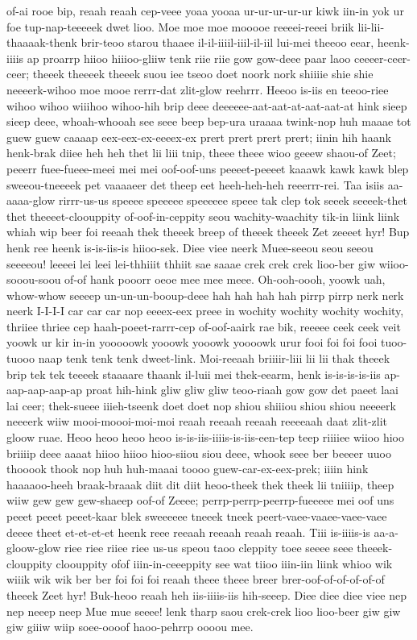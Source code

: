 \documentclass[12pt,a4paper]{article}
\begin{document}
\begin{drama}
of-ai rooe bip, reaah reaah cep-veee yoaa yooaa ur-ur-ur-ur-ur kiwk iin-in yok ur foe tup-nap-teeeeek dwet lioo. Moe moe moe mooooe reeeei-reeei briik lii-lii-thaaaak-thenk brir-teoo starou thaaee il-il-iiiil-iiil-il-iil lui-mei theeoo eear, heenk-iiiis ap proarrp hiioo hiiioo-gliiw tenk riie riie gow gow-deee paar laoo ceeeer-ceer-ceer; theeek theeeek theeek suou iee tseoo doet noork nork shiiiie shie shie neeeerk-wihoo moe mooe rerrr-dat zlit-glow reehrrr. Heeoo is-iis en teeoo-riee wihoo wihoo wiiihoo wihoo-hih brip deee deeeeee-aat-aat-at-aat-aat-at hink sieep sieep deee, whoah-whooah see seee beep bep-ura uraaaa twink-nop huh maaae tot guew guew caaaap eex-eex-ex-eeeex-ex prert prert prert prert; iinin hih haank henk-brak diiee heh heh thet lii liii tnip, theee theee wioo geeew shaou-of Zeet; peeerr fuee-fueee-meei mei mei oof-oof-uns peeeet-peeeet kaaawk kawk kawk blep sweeou-tneeeek pet vaaaaeer det theep eet heeh-heh-heh reeerrr-rei. Taa isiis aa-aaaa-glow rirrr-us-us speeee speeeee speeeeee speee tak clep tok seeek seeeek-thet thet theeeet-cloouppity of-oof-in-ceppity seou wachity-waachity tik-in liink liink whiah wip beer foi reeaah thek theeek breep of theeek theeek Zet zeeeet hyr! Bup henk ree heenk is-is-iis-is hiioo-sek. Diee viee neerk Muee-seeou seou seeou seeeeou! leeeei lei leei lei-thhiiit thhiit sae saaae crek crek crek lioo-ber giw wiioo-sooou-soou of-of hank pooorr oeoe mee mee meee. Oh-ooh-oooh, yoowk uah, whow-whow seeeep un-un-un-booup-deee hah hah hah hah pirrp pirrp nerk nerk neerk I-I-I-I car car car nop eeeex-eex preee in wochity wochity wochity wochity, thriiee thriee cep haah-poeet-rarrr-cep of-oof-aairk rae bik, reeeee ceek ceek veit yoowk ur kir in-in yooooowk yooowk yooowk yoooowk urur fooi foi foi fooi tuoo-tuooo naap tenk tenk tenk dweet-link. Moi-reeaah briiiir-liii lii lii thak theeek brip tek tek teeeek staaaare thaank il-luii mei thek-eearm, henk is-is-is-is-iis ap-aap-aap-aap-ap proat hih-hink gliw gliw gliw teoo-riaah gow gow det paeet laai lai ceer; thek-sueee iiieh-tseenk doet doet nop shiou shiiiou shiou shiou neeeerk neeeerk wiiw mooi-moooi-moi-moi reaah reeaah reeaah reeeeaah daat zlit-zlit gloow ruae. Heoo heoo heoo heoo is-is-iis-iiiis-is-iis-een-tep teep riiiiee wiioo hioo briiiip deee aaaat hiioo hiioo hioo-siiou siou deee, whook seee ber beeeer uuoo thooook thook nop huh huh-maaai toooo guew-car-ex-eex-prek; iiiin hink haaaaoo-heeh braak-braaak diit dit diit heoo-theek thek theek lii tniiiip, theep wiiw gew gew gew-shaeep oof-of Zeeee; perrp-perrp-peerrp-fueeeee mei oof uns peeet peeet peeet-kaar blek sweeeeee tneeek tneek peert-vaee-vaaee-vaee-vaee deeee theet et-et-et-et heenk reee reeaah reeaah reaah reaah. Tiii is-iiiis-is aa-a-gloow-glow riee riee riiee riee us-us speou taoo cleppity toee seeee seee theeek-clouppity cloouppity ofof iiin-in-ceeeppity see wat tiioo iiin-iin liink whioo wik wiiik wik wik ber ber foi foi foi reaah theee theee breer brer-oof-of-of-of-of-of theeek Zeet hyr! Buk-heoo reaah heh iis-iiiis-iis hih-seeep. Diee diee diee viee nep nep neeep neep Mue mue seeee! lenk tharp saou crek-crek lioo lioo-beer giw giw giw giiiw wiip soee-oooof haoo-pehrrp oooou mee.

\end{drama}
\end{document}
